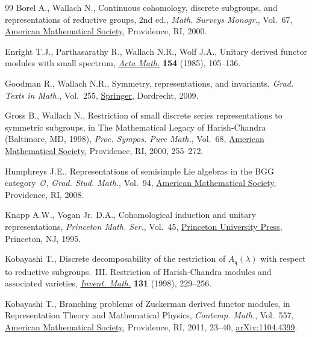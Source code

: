 \documentclass[11pt]{article}
\numberwithin{equation}{section}
\numberwithin{equation}{section}
\theoremstyle{definition}
\begin{document}
\begin{thebibliography}{99}
Borel A., Wallach N., Continuous cohomology, discrete subgroups, and
 representations of reductive groups, 2nd ed., \textit{Math. Surveys Monogr.}, Vol.~67, \href{https://doi.org/10.1090/surv/067}{American Mathematical Society}, Providence, RI, 2000.

Enright T.J., Parthasarathy R., Wallach N.R., Wolf J.A., Unitary derived
 functor modules with small spectrum,
 \href{https://doi.org/10.1007/BF02392820}{\textit{Acta Math.}} \textbf{154}
 (1985), 105--136.

Goodman R., Wallach N.R., Symmetry, representations, and invariants,
 \textit{Grad. Texts in Math.}, Vol.~255,
 \href{https://doi.org/10.1007/978-0-387-79852-3}{Springer}, Dordrecht, 2009.

Gross B., Wallach N., Restriction of small discrete series representations to
 symmetric subgroups, in The Mathematical Legacy of {H}arish-{C}handra
 ({B}altimore, {MD}, 1998), \textit{Proc. Sympos. Pure Math.}, Vol.~68,
 \href{https://doi.org/10.1090/pspum/068/1767899}{American Mathematical
 Society}, Providence, RI, 2000, 255--272.

Humphreys J.E., Representations of semisimple {L}ie algebras in the {BGG}
 category~{$\mathcal{O}$}, \textit{Grad. Stud. Math.}, Vol.~94,
 \href{https://doi.org/10.1090/gsm/094}{American Mathematical Society},
 Providence, RI, 2008.

Knapp A.W., Vogan Jr. D.A., Cohomological induction and unitary
 representations, \textit{Princeton Math. Ser.}, Vol.~45,
 \href{https://doi.org/10.1515/9781400883936}{Princeton University Press},
 Princeton, NJ, 1995.

Kobayashi T., Discrete decomposability of the restriction of
 {$A_{\mathfrak{q}}(\lambda)$} with respect to reductive subgroups.~{III}.
 {R}estriction of {H}arish-{C}handra modules and associated varieties,
 \href{https://doi.org/10.1007/s002220050203}{\textit{Invent. Math.}}
 \textbf{131} (1998), 229--256.

Kobayashi T., Branching problems of {Z}uckerman derived functor modules, in
 Representation Theory and Mathematical Physics, \textit{Contemp. Math.}, Vol.~557, \href{https://doi.org/10.1090/conm/557/11024}{American Mathematical
 Society}, Providence, RI, 2011, 23--40,
 \href{http://arxiv.org/abs/1104.4399}{arXiv:1104.4399}.


\end{thebibliography}
\end{document}
